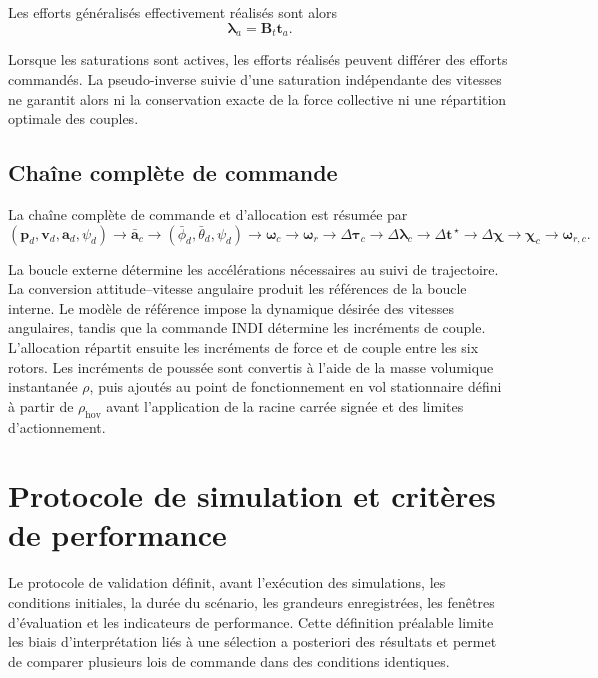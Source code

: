 \documentclass[11pt,a4paper,oneside]{report}
\newcommand{\vect}[1]{\bm{#1}}
\begin{document}
Les efforts généralisés effectivement réalisés sont alors
\begin{equation}
	\vect\lambda_a
	=
	\mathbf B_t\vect t_a.
	\label{eq_achievable_generalized_wrench}
\end{equation}

Lorsque les saturations sont actives, les efforts réalisés peuvent différer des efforts commandés. La pseudo-inverse suivie d'une saturation indépendante des vitesses ne garantit alors ni la conservation exacte de la force collective ni une répartition optimale des couples.

\section{Chaîne complète de commande}

La chaîne complète de commande et d'allocation est résumée par
\begin{equation}
	\left(
	\vect p_d,
	\vect v_d,
	\vect a_d,
	\psi_d
	\right)
	\longrightarrow
	\bar{\vect a}_c
	\longrightarrow
	\left(
	\bar\phi_d,
	\bar\theta_d,
	\psi_d
	\right)
	\longrightarrow
	\vect\omega_c
	\longrightarrow
	\vect\omega_r
	\longrightarrow
	\Delta\vect\tau_c
	\longrightarrow
	\Delta\vect\lambda_c
	\longrightarrow
	\Delta\vect t^{\,\star}
	\longrightarrow
	\Delta\vect\chi
	\longrightarrow
	\vect\chi_c
	\longrightarrow
	\vect\omega_{r,c}.
	\label{eq_complete_control_chain}
\end{equation}

La boucle externe détermine les accélérations nécessaires au suivi de trajectoire. La conversion attitude--vitesse angulaire produit les références de la boucle interne. Le modèle de référence impose la dynamique désirée des vitesses angulaires, tandis que la commande INDI détermine les incréments de couple. L'allocation répartit ensuite les incréments de force et de couple entre les six rotors. Les incréments de poussée sont convertis à l'aide de la masse volumique instantanée $\rho$, puis ajoutés au point de fonctionnement en vol stationnaire défini à partir de $\rho_{\mathrm{hov}}$ avant l'application de la racine carrée signée et des limites d'actionnement.
	

	\chapter{Protocole de simulation et critères de performance}
	\label{chap_validation}
	
	Le protocole de validation définit, avant l'exécution des simulations, les conditions initiales, la durée du scénario, les grandeurs enregistrées, les fenêtres d'évaluation et les indicateurs de performance. Cette définition préalable limite les biais d'interprétation liés à une sélection a posteriori des résultats et permet de comparer plusieurs lois de commande dans des conditions identiques.
	
\end{document}
